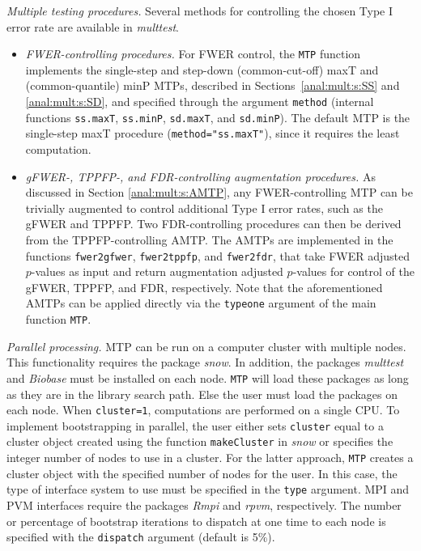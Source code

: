 \documentclass[11pt]{article}
\newcommand{\Rpackage}[1]{\textit{#1}}
\newcommand{\Robject}[1]{\texttt{#1}}
\begin{document}
\begin{description}
\item{\em Multiple testing procedures.} 
Several methods for controlling the chosen Type I error rate are available in \Rpackage{multtest}. 
\begin{itemize}
\item
{\em FWER-controlling procedures.}
For FWER control, the \Robject{MTP} function implements the single-step and step-down (common-cut-off) maxT and (common-quantile) minP MTPs, described in Sections~\ref{anal:mult:s:SS} and \ref{anal:mult:s:SD}, and specified through the argument \Robject{method} (internal functions \Robject{ss.maxT}, \Robject{ss.minP}, \Robject{sd.maxT}, and \Robject{sd.minP}).
The default MTP is the single-step maxT procedure (\Robject{method="ss.maxT"}), since it requires the least computation.
\item 
{\em gFWER-, TPPFP-, and FDR-controlling augmentation procedures.} 
As discussed in Section \ref{anal:mult:s:AMTP}, any FWER-controlling MTP can be trivially augmented to control additional Type I error rates, such as the gFWER and TPPFP.
Two FDR-controlling procedures can then be derived from the TPPFP-controlling AMTP.
The AMTPs are implemented in the functions \Robject{fwer2gfwer}, \Robject{fwer2tppfp}, and \Robject{fwer2fdr}, that take FWER adjusted $p$-values as input and return augmentation adjusted $p$-values for control of the gFWER, TPPFP, and FDR, respectively. 
Note that the aforementioned AMTPs can be applied directly via the \Robject{typeone} argument of the main function \Robject{MTP}.
\end{itemize}

\item{\em Parallel processing.}
MTP can be run on a computer cluster with multiple nodes. This functionality requires the package \Rpackage{snow}. In addition, the packages \Rpackage{multtest} and \Rpackage{Biobase} must be
installed on each node. \Robject{MTP} will load these packages as long as they are in the library
search path. Else the user must load the packages on each node. When \Robject{cluster=1}, computations are performed on a single CPU. To implement bootstrapping in parallel, the user either sets \Robject{cluster} equal to a cluster object created using the function \Robject{makeCluster} 
in \Rpackage{snow} or specifies the integer number of nodes to use in a cluster. For the latter 
approach, \Robject{MTP} creates a cluster object with the specified number of nodes for the user. 
In this case, the type of interface system to use must be specified in the \Robject{type} argument. 
MPI and PVM interfaces require the packages \Rpackage{Rmpi} and \Rpackage{rpvm}, respectively. The number or percentage of bootstrap iterations to dispatch at one time to each node is specified 
with the \Robject{dispatch} argument (default is 5\%).


\end{description}
\end{document}
